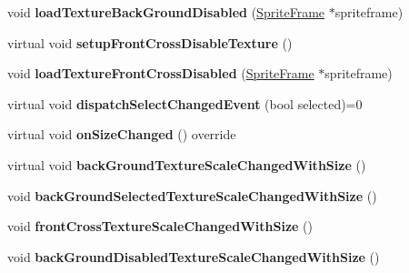 \begin{DoxyCompactItemize}
\mbox{\label{classui_1_1AbstractCheckButton_ac5011dfae46f5f5d676fd48ecb5c1399}} 
void {\bfseries load\+Texture\+Back\+Ground\+Disabled} (\hyperlink{classSpriteFrame}{Sprite\+Frame} $\ast$spriteframe)
\item 
\mbox{\label{classui_1_1AbstractCheckButton_a8e88ab7113e7c66cf417c50683b383ab}} 
virtual void {\bfseries setup\+Front\+Cross\+Disable\+Texture} ()
\item 
\mbox{\label{classui_1_1AbstractCheckButton_a1d9def119477f9cba2bc55191645e016}} 
void {\bfseries load\+Texture\+Front\+Cross\+Disabled} (\hyperlink{classSpriteFrame}{Sprite\+Frame} $\ast$spriteframe)
\item 
\mbox{\label{classui_1_1AbstractCheckButton_ac704c19d4c87d252d8a5974ede1742ac}} 
virtual void {\bfseries dispatch\+Select\+Changed\+Event} (bool selected)=0
\item 
\mbox{\label{classui_1_1AbstractCheckButton_adc7df23c9456b4804d769e1dbf677e1d}} 
virtual void {\bfseries on\+Size\+Changed} () override
\item 
\mbox{\label{classui_1_1AbstractCheckButton_a021172c93df99f592bd5c4c2f2490c4f}} 
virtual void {\bfseries back\+Ground\+Texture\+Scale\+Changed\+With\+Size} ()
\item 
\mbox{\label{classui_1_1AbstractCheckButton_a3abc6c1304a56471f2cdcd810450b46b}} 
void {\bfseries back\+Ground\+Selected\+Texture\+Scale\+Changed\+With\+Size} ()
\item 
\mbox{\label{classui_1_1AbstractCheckButton_a26420a2f79fb04c55743a4a02170c0a5}} 
void {\bfseries front\+Cross\+Texture\+Scale\+Changed\+With\+Size} ()
\item 
\mbox{\label{classui_1_1AbstractCheckButton_ab663acaa710d54639fcb5e51ddb2588a}} 
void {\bfseries back\+Ground\+Disabled\+Texture\+Scale\+Changed\+With\+Size} ()
\item 
\mbox{\label{classui_1_1AbstractCheckButton_ab8f5c74a2c6c11330b2bd4ba8044d628}} 

\end{DoxyCompactItemize}
